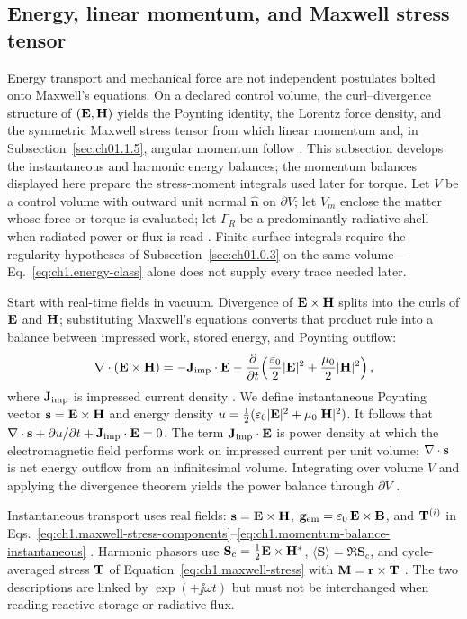 \subsection{Energy, linear momentum, and Maxwell stress tensor}
\label{sec:ch01.1.4}

Energy transport and mechanical force are not independent postulates bolted onto Maxwell's equations. On a declared control volume, the curl--divergence structure of $(\mathbf{E},\mathbf{H})$ yields the Poynting identity, the Lorentz force density, and the symmetric Maxwell stress tensor from which linear momentum and, in Subsection~\ref{sec:ch01.1.5}, angular momentum follow \cite{poynting1884,maxwell1873}. This subsection develops the instantaneous and harmonic energy balances; the momentum balances displayed here prepare the stress-moment integrals used later for torque. Let $V$ be a control volume with outward unit normal $\hat{\mathbf{n}}$ on $\partial V$; let $V_m$ enclose the matter whose force or torque is evaluated; let $\Gamma_R$ be a predominantly radiative shell when radiated power or flux is read \cite{stratton1941}. Finite surface integrals require the regularity hypotheses of Subsection~\ref{sec:ch01.0.3} on the same volume---Eq.~\eqref{eq:ch1.energy-class} alone does not supply every trace needed later.

Start with real-time fields in vacuum. Divergence of $\mathbf{E}\times\mathbf{H}$ splits into the curls of $\mathbf{E}$ and $\mathbf{H}$; substituting Maxwell's equations converts that product rule into a balance between impressed work, stored energy, and Poynting outflow:
\begin{equation}
\label{eq:ch1.poynting-instantaneous}
\nabla\cdot(\mathbf{E}\times\mathbf{H})
=-\mathbf{J}_{\mathrm{imp}}\cdot\mathbf{E}
-\frac{\partial}{\partial t}\!\left(\frac{\varepsilon_0}{2}|\mathbf{E}|^2+\frac{\mu_0}{2}|\mathbf{H}|^2\right),
\end{equation}
where $\mathbf{J}_{\mathrm{imp}}$ is impressed current density \cite{stratton1941}. We define instantaneous
Poynting vector $\mathbf{s}=\mathbf{E}\times\mathbf{H}$ and energy density
$u=\tfrac12(\varepsilon_0|\mathbf{E}|^2+\mu_0|\mathbf{H}|^2)$. It follows that
$\nabla\cdot\mathbf{s}+\partial u/\partial t+\mathbf{J}_{\mathrm{imp}}\cdot\mathbf{E}=0$. The term $\mathbf{J}_{\mathrm{imp}}\cdot\mathbf{E}$ is
power density at which the electromagnetic field performs work on impressed current per unit volume; $\nabla\cdot\mathbf{s}$ is net energy
outflow from an infinitesimal volume. Integrating over volume $V$ and applying the
divergence theorem yields the power balance through $\partial V$ \cite{poynting1884}.

Instantaneous transport uses real fields: $\mathbf{s}=\mathbf{E}\times\mathbf{H}$, $\mathbf{g}_{\mathrm{em}}=\varepsilon_0\,\mathbf{E}\times\mathbf{B}$, and $\mathbf{T}^{(i)}$ in Eqs.~\eqref{eq:ch1.maxwell-stress-components}--\eqref{eq:ch1.momentum-balance-instantaneous} \cite{maxwell1873,poynting1884}. Harmonic phasors use $\mathbf{S}_\mathrm{c}=\tfrac12\mathbf{E}\times\mathbf{H}^*$, $\langle\mathbf{S}\rangle=\Re\mathbf{S}_\mathrm{c}$, and cycle-averaged stress $\mathbf{T}$ of Equation~\eqref{eq:ch1.maxwell-stress} with $\mathbf{M}=\mathbf{r}\times\mathbf{T}$ \cite{stratton1941}. The two descriptions are linked by $\exp(+\jj\omega t)$ but must not be interchanged when reading reactive storage or radiative flux.

